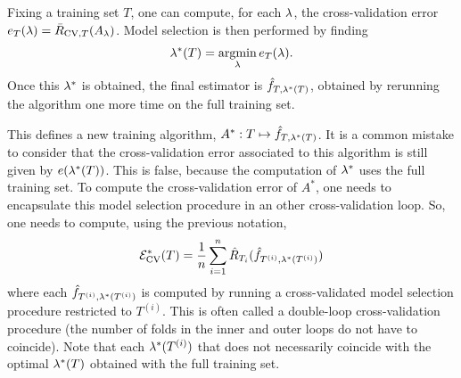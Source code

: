 Fixing a training set $T$, one can compute, for each $\lambda$,  the  cross-validation error $e_T(\lambda) = \bar R_{\mathrm{CV}, T}(A_\lambda)$. Model selection is then performed by finding 
\[
\lambda^*(T) = \operatorname*{argmin}_\lambda e_T(\lambda). 
\]
Once this $\lambda^*$ is obtained, the final estimator is ${\hat{f}}_{T, \lambda^*(T)}$, obtained by rerunning the algorithm one more time on the full training set. 

This defines a new training algorithm, $A^*: T \mapsto {\hat{f}}_{T, \lambda^*(T)}$. It is a common mistake to consider that the cross-validation error associated to this algorithm is still given by $e(\lambda^*(T))$. This is false, because the computation of $\lambda^*$ uses the full training set. To compute the cross-validation error of $A^*$, one needs to encapsulate this model selection procedure in an other cross-validation loop. So, one needs to compute, using the previous notation,
\[
{\mathcal E}^*_{\mathrm{CV}}(T) = \frac1n \sum_{i=1}^n \hat R_{T_i}({\hat{f}}_{T^{(i)}, \lambda^*(T^{(i)})})
\]
where each ${\hat{f}}_{T^{(i)}, \lambda^*(T^{(i)})}$ is computed by running a cross-validated model selection procedure restricted to $T^{(i)}$. This is often called a double-loop cross-validation procedure (the number of folds in the inner and outer loops do not have to coincide). 
Note that each $\lambda^*(T^{(i)})$ that does not necessarily coincide with the optimal $\lambda^*(T)$ obtained with the full training set. 


